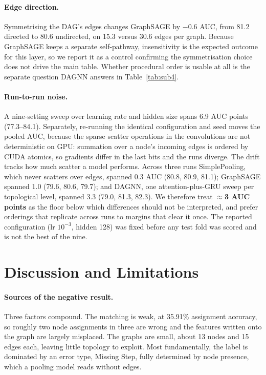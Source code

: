 \documentclass[10pt,twocolumn,letterpaper]{article}
\begin{document}
\paragraph{Edge direction.} Symmetrising the DAG's edges changes GraphSAGE by
$-0.6$ AUC, from 81.2 directed to 80.6 undirected, on 15.3 versus 30.6 edges per
graph. Because GraphSAGE keeps a separate self-pathway, insensitivity is the
expected outcome for this layer, so we report it as a control confirming the
symmetrisation choice does not drive the main table. Whether procedural order is
usable at all is the separate question DAGNN answers in Table~\ref{tab:sub4}.

\paragraph{Run-to-run noise.} \label{sec:noise}
A nine-setting sweep over learning rate and hidden size spans 6.9 AUC points
(77.3--84.1). Separately, re-running the identical configuration and seed moves the
pooled AUC, because the sparse scatter operations in the convolutions are not
deterministic on GPU: summation over a node's incoming edges is ordered by CUDA
atomics, so gradients differ in the last bits and the runs diverge. The drift tracks
how much scatter a model performs. Across three runs SimplePooling, which never
scatters over edges, spanned 0.3 AUC (80.8, 80.9, 81.1); GraphSAGE spanned 1.0
(79.6, 80.6, 79.7); and DAGNN, one attention-plus-GRU sweep per topological level,
spanned 3.3 (79.0, 81.3, 82.3). We therefore treat \textbf{$\approx$3 AUC points} as
the floor below which differences should not be interpreted, and prefer orderings
that replicate across runs to margins that clear it once. The reported configuration
(lr $10^{-3}$, hidden 128) was fixed before any test fold was scored and is not the
best of the nine.

\section{Discussion and Limitations}

\paragraph{Sources of the negative result.} Three factors compound. The matching is
weak, at 35.91\% assignment accuracy, so roughly two node assignments in three are
wrong and the features written onto the graph are largely misplaced. The graphs are
small, about 13 nodes and 15 edges each, leaving little topology to exploit. Most
fundamentally, the label is dominated by an error type, Missing Step, fully
determined by node presence, which a pooling model reads without edges.
\end{document}
